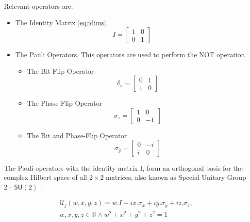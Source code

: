 \documentclass[10pt,twocolumn]{llncs}
\begin{document}
Relevant operators are:

\begin{itemize}
\item The Identity Matrix \ref{eq:idims}.
\begin{equation}
\label{eq:idims}
I=\left[\begin{array}{cc}
1 & 0\\
0 & 1
\end{array}\right]
\end{equation}

\item The Pauli Operators. This operators are used to perform the NOT operation. 
	\begin{itemize}
		\item The Bit-Flip Operator\begin{equation}
\label{eq:idims_1}
\delta_{x} =\left[\begin{array}{cc}
0 & 1\\
1 & 0
\end{array}\right]
\end{equation}
		\item The Phase-Flip Operator\begin{equation}
\label{eq:idims_2}
\sigma_{z} =\left[\begin{array}{cc}
1 & 0\\
0 & -1
\end{array}\right]
\end{equation}
\item The Bit and Phase-Flip Operator\begin{equation}
\label{eq:idims_3}
\sigma_{y}=\left[\begin{array}{cc}
0 & -i\\
i & 0
\end{array}\right]
\end{equation}
	\end{itemize}

\end{itemize}

The Pauli operators with the identity matrix I, form an orthogonal basis for the complex Hilbert space of all $2 \times 2$ matrices, also known as Special Unitary Group 2 - $\mathsf{SU}(2)$ \cite{Letters2002}.

\begin{equation}
\begin{split}
\mathcal{U}_{j}(w,x,y,z)=w.I + ix.\sigma_{x} + iy.\sigma_{y} + iz.\sigma_{z}, \\  w,x,y,z \in \mathbb{R} \wedge  
w^2 + x^2 + y^2 + z^2 =1 
\end{split}
\label{eq:general_unitary_special_one}
\end{equation}
\end{document}
